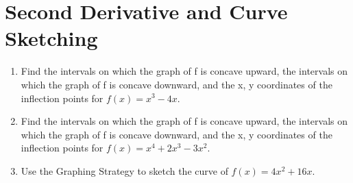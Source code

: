 \documentclass[14pt]{extarticle}
\begin{document}
\cleardoublepage
\section{Second Derivative and Curve Sketching}

\begin{enumerate}
	\item Find the intervals on which the graph of f is concave upward, the intervals on which the graph of f is concave downward, and the x, y coordinates of the inflection points for $f(x)=x^3-4x$.
	\vspace{6cm}
	
	\item  Find the intervals on which the graph of f is concave upward, the intervals on which	the graph of f is concave downward, and the x, y coordinates of the inflection points for $f(x)=x^4+2x^3 -3x^2$.
	\vspace{6cm}
	
	\item Use the Graphing Strategy to sketch the curve of $f(x)=4x^2+16x$.
	
\end{enumerate}

\cleardoublepage
\end{document}
